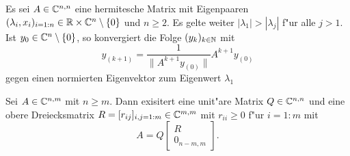 \newpage

\begin{thm}[Potenzmethode]\label{thm:appTheorems:Potenzmethode} Es sei $A\in\mathbb{C}^{n,n}$ eine hermitesche Matrix mit Eigenpaaren $(\lambda_i,x_i)_{i=1:n} \in \mathbb{R}\times\mathbb{C}^n \setminus\{0\}$ und $n\ge 2$.
Es gelte weiter $|\lambda_1| > |\lambda_j|$ f"ur alle
$j > 1$. Ist $y_0 \in\mathbb{C}^n \setminus\{0\}$, so konvergiert die Folge
$(y_k)_{k\in\mathbb{N}}$ mit
\[
y_{(k+1)} = \frac{1}{\|A^{k+1} y_{(0)}\|} A^{k+1}y_{(0)}
\]
gegen einen normierten Eigenvektor zum Eigenwert $\lambda_1$
\end{thm}

\begin{thm}[QR-Zerlegung]\label{thm:appTheorems:QR}
Sei $A\in\mathbb{C}^{n,m}$ mit $n\ge m$. Dann exisitert eine unit"are Matrix $Q\in\mathbb{C}^{n,n}$ und eine obere Dreiecksmatrix $R = [r_{ij}]_{i,j=1:m}\in\mathbb{C}^{m,m}$ mit $r_{ii}\ge 0$ f"ur $i=1:m$ mit
\[
A = Q\begin{bmatrix} R \\ 0_{n-m,m} \end{bmatrix}.
\]
\end{thm}
